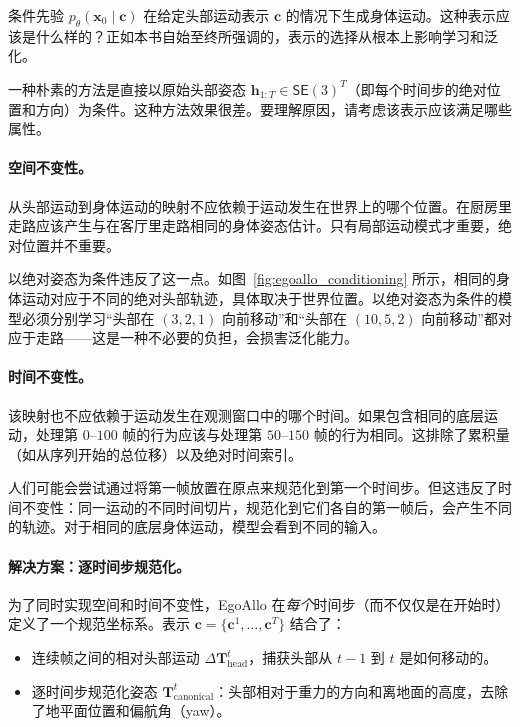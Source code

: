 \documentclass[../../book-main_zh.tex]{subfiles}
\begin{document}
条件先验 $p_\theta(\boldsymbol{x}_0 \mid \boldsymbol{c})$ 在给定头部运动表示 $\boldsymbol{c}$ 的情况下生成身体运动。这种表示应该是什么样的？正如本书自始至终所强调的，表示的选择从根本上影响学习和泛化。

一种朴素的方法是直接以原始头部姿态 $\boldsymbol{h}_{1:T} \in \mathsf{SE}(3)^T$（即每个时间步的绝对位置和方向）为条件。这种方法效果很差。要理解原因，请考虑该表示应该满足哪些属性。

\paragraph{空间不变性。}
从头部运动到身体运动的映射不应依赖于运动发生在世界上的哪个位置。在厨房里走路应该产生与在客厅里走路相同的身体姿态估计。只有局部运动模式才重要，绝对位置并不重要。

以绝对姿态为条件违反了这一点。如图~\ref{fig:egoallo_conditioning} 所示，相同的身体运动对应于不同的绝对头部轨迹，具体取决于世界位置。以绝对姿态为条件的模型必须分别学习“头部在 $(3,2,1)$ 向前移动”和“头部在 $(10,5,2)$ 向前移动”都对应于走路——这是一种不必要的负担，会损害泛化能力。

\paragraph{时间不变性。}
该映射也不应依赖于运动发生在观测窗口中的哪个时间。如果包含相同的底层运动，处理第 $0$--$100$ 帧的行为应该与处理第 $50$--$150$ 帧的行为相同。这排除了累积量（如从序列开始的总位移）以及绝对时间索引。

人们可能会尝试通过将第一帧放置在原点来规范化到第一个时间步。但这违反了时间不变性：同一运动的不同时间切片，规范化到它们各自的第一帧后，会产生不同的轨迹。对于相同的底层身体运动，模型会看到不同的输入。

\paragraph{解决方案：逐时间步规范化。}
为了同时实现空间和时间不变性，EgoAllo 在\emph{每个}时间步（而不仅仅是在开始时）定义了一个规范坐标系。表示 $\boldsymbol{c} = \{\boldsymbol{c}^{1}, \dots,
\boldsymbol{c}^{T}\}$ 结合了：
\begin{itemize}
    \item 连续帧之间的相对头部运动 $\Delta\boldsymbol{T}_{\text{head}}^{t}$，捕获头部从 $t-1$ 到 $t$ 是如何移动的。
    \item 逐时间步规范化姿态
        $\boldsymbol{T}_{\text{canonical}}^{t}$：头部相对于重力的方向和离地面的高度，去除了地平面位置和偏航角（yaw）。
\end{itemize}
\end{document}

